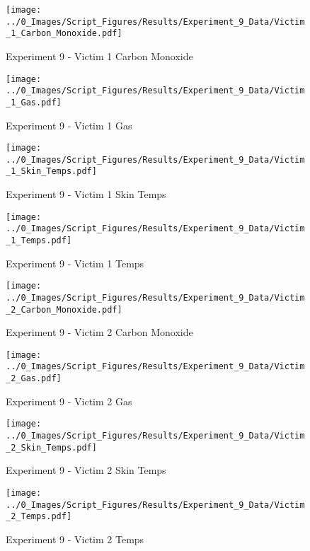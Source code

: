 	\clearpage

	\begin{figure}[H]
		\centering
		\texttt{[image: ../0\_Images/Script\_Figures/Results/Experiment\_9\_Data/Victim\_1\_Carbon\_Monoxide.pdf]}
		\caption[]{Experiment 9 - Victim 1 Carbon Monoxide}
	\end{figure}
 

	\begin{figure}[H]
		\centering
		\texttt{[image: ../0\_Images/Script\_Figures/Results/Experiment\_9\_Data/Victim\_1\_Gas.pdf]}
		\caption[]{Experiment 9 - Victim 1 Gas}
	\end{figure}
 
	\clearpage

	\begin{figure}[H]
		\centering
		\texttt{[image: ../0\_Images/Script\_Figures/Results/Experiment\_9\_Data/Victim\_1\_Skin\_Temps.pdf]}
		\caption[]{Experiment 9 - Victim 1 Skin Temps}
	\end{figure}
 

	\begin{figure}[H]
		\centering
		\texttt{[image: ../0\_Images/Script\_Figures/Results/Experiment\_9\_Data/Victim\_1\_Temps.pdf]}
		\caption[]{Experiment 9 - Victim 1 Temps}
	\end{figure}
 
	\clearpage

	\begin{figure}[H]
		\centering
		\texttt{[image: ../0\_Images/Script\_Figures/Results/Experiment\_9\_Data/Victim\_2\_Carbon\_Monoxide.pdf]}
		\caption[]{Experiment 9 - Victim 2 Carbon Monoxide}
	\end{figure}
 

	\begin{figure}[H]
		\centering
		\texttt{[image: ../0\_Images/Script\_Figures/Results/Experiment\_9\_Data/Victim\_2\_Gas.pdf]}
		\caption[]{Experiment 9 - Victim 2 Gas}
	\end{figure}
 
	\clearpage

	\begin{figure}[H]
		\centering
		\texttt{[image: ../0\_Images/Script\_Figures/Results/Experiment\_9\_Data/Victim\_2\_Skin\_Temps.pdf]}
		\caption[]{Experiment 9 - Victim 2 Skin Temps}
	\end{figure}
 

	\begin{figure}[H]
		\centering
		\texttt{[image: ../0\_Images/Script\_Figures/Results/Experiment\_9\_Data/Victim\_2\_Temps.pdf]}
		\caption[]{Experiment 9 - Victim 2 Temps}
	\end{figure}
 
